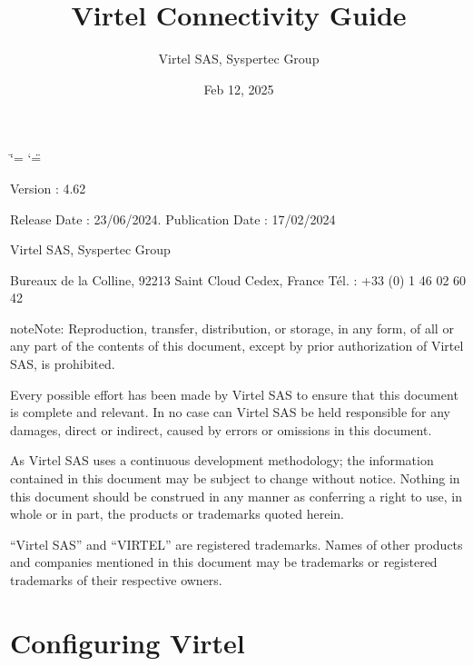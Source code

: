 \documentclass[letterpaper,10pt,english]{sphinxmanual}
\title{Virtel Connectivity Guide}
\date{Feb 12, 2025}
\author{Virtel SAS, Syspertec Group}
\begin{document}
\ifdefined\shorthandoff
  \ifnum\catcode`\=\string=\active\shorthandoff{=}\fi
  \ifnum\catcode`\"=\active{}\fi
\fi

\pagestyle{empty}
\sphinxmaketitle
\pagestyle{plain}
\sphinxtableofcontents
\pagestyle{normal}
\label{\detokenize{connectivity_guide::doc}}


\sphinxAtStartPar
{}

\sphinxAtStartPar
{}

\sphinxAtStartPar
Version : 4.62

\sphinxAtStartPar
Release Date : 23/06/2024. Publication Date : 17/02/2024

\sphinxAtStartPar
Virtel SAS, Syspertec Group

 Bureaux de la Colline, 92213 Saint Cloud Cedex, France Tél. : +33 (0) 1 46 02 60 42

\sphinxAtStartPar
{}

\begin{sphinxadmonition}{note}{Note:}
\sphinxAtStartPar
Reproduction, transfer, distribution, or storage, in any form, of all or any part of
the contents of this document, except by prior authorization of Virtel SAS, is prohibited.

\sphinxAtStartPar
Every possible effort has been made by Virtel SAS to ensure that this document
is complete and relevant. In no case can Virtel SAS be held responsible for
any damages, direct or indirect, caused by errors or omissions in this document.

\sphinxAtStartPar
As Virtel SAS uses a continuous development methodology; the information
contained in this document may be subject to change without notice. Nothing in this
document should be construed in any manner as conferring a right to use, in whole or in
part, the products or trademarks quoted herein.

\sphinxAtStartPar
“Virtel SAS” and “VIRTEL” are registered trademarks. Names of other products
and companies mentioned in this document may be trademarks or registered trademarks of
their respective owners.
\end{sphinxadmonition}


\chapter{Configuring Virtel}
\label{\detokenize{connectivity_guide:configuring-virtel}}\label{\detokenize{connectivity_guide:v462cn-introduction}}
\end{document}
